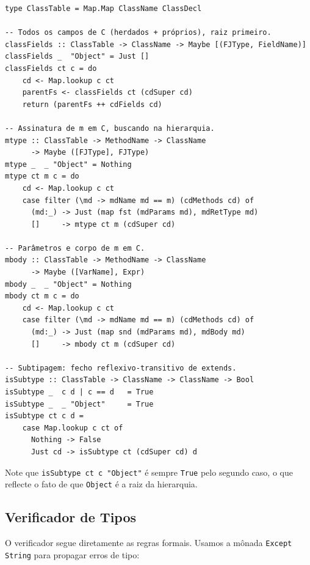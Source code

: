 \begin{verbatim}
type ClassTable = Map.Map ClassName ClassDecl

-- Todos os campos de C (herdados + próprios), raiz primeiro.
classFields :: ClassTable -> ClassName -> Maybe [(FJType, FieldName)]
classFields _  "Object" = Just []
classFields ct c = do
    cd <- Map.lookup c ct
    parentFs <- classFields ct (cdSuper cd)
    return (parentFs ++ cdFields cd)

-- Assinatura de m em C, buscando na hierarquia.
mtype :: ClassTable -> MethodName -> ClassName
      -> Maybe ([FJType], FJType)
mtype _  _ "Object" = Nothing
mtype ct m c = do
    cd <- Map.lookup c ct
    case filter (\md -> mdName md == m) (cdMethods cd) of
      (md:_) -> Just (map fst (mdParams md), mdRetType md)
      []     -> mtype ct m (cdSuper cd)

-- Parâmetros e corpo de m em C.
mbody :: ClassTable -> MethodName -> ClassName
      -> Maybe ([VarName], Expr)
mbody _  _ "Object" = Nothing
mbody ct m c = do
    cd <- Map.lookup c ct
    case filter (\md -> mdName md == m) (cdMethods cd) of
      (md:_) -> Just (map snd (mdParams md), mdBody md)
      []     -> mbody ct m (cdSuper cd)

-- Subtipagem: fecho reflexivo-transitivo de extends.
isSubtype :: ClassTable -> ClassName -> ClassName -> Bool
isSubtype _  c d | c == d   = True
isSubtype _  _ "Object"     = True
isSubtype ct c d =
    case Map.lookup c ct of
      Nothing -> False
      Just cd -> isSubtype ct (cdSuper cd) d
\end{verbatim}

Note que \texttt{isSubtype ct c "Object"} é sempre
\texttt{True} pelo segundo caso, o que reflecte o
fato de que \texttt{Object} é a raiz da hierarquia.

\subsection{Verificador de Tipos}

O verificador segue diretamente as regras formais. Usamos a mônada
\texttt{Except String} para propagar erros de tipo:

